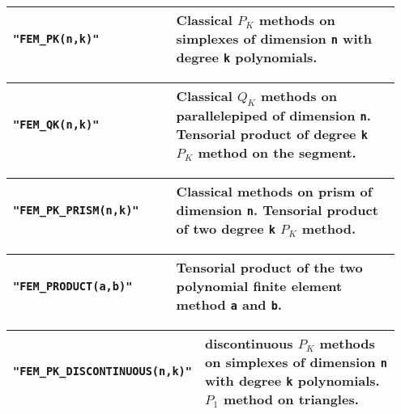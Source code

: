 \begin{center} \begin{tabular}{|m{0.40\linewidth}|m{0.55\linewidth}|} \hline
{\tt "FEM\_PK(n,k)"} & Classical $P_K$ methods on simplexes of dimension  {\tt n} with degree {\tt k} polynomials.\\ \hline
\end{tabular}  
\begin{tabular}{|m{0.40\linewidth}|m{0.55\linewidth}|} \hline
{\tt "FEM\_QK(n,k)"} & Classical $Q_K$ methods on parallelepiped of dimension {\tt n}. Tensorial product of degree {\tt k} $P_K$ method on the segment. \\ \hline
\end{tabular}  
\begin{tabular}{|m{0.40\linewidth}|m{0.55\linewidth}|} \hline
{\tt "FEM\_PK\_PRISM(n,k)"} & Classical methods on prism of dimension {\tt n}. Tensorial product of two degree {\tt k} $P_K$ method. \\ \hline
\end{tabular}  
\begin{tabular}{|m{0.40\linewidth}|m{0.55\linewidth}|} \hline
{\tt "FEM\_PRODUCT(a,b)"} & Tensorial product of the two polynomial finite element method {\tt a} and {\tt b}. \\ \hline
\end{tabular}   
\begin{tabular}{|m{0.40\linewidth}|m{0.55\linewidth}|} \hline
{\tt "FEM\_PK\_DISCONTINUOUS(n,k)"} & discontinuous $P_K$ methods on simplexes of dimension  {\tt n} with degree {\tt k} polynomials. $P_1$ method on triangles. \\ \hline
\end{tabular}  
\end{center}

